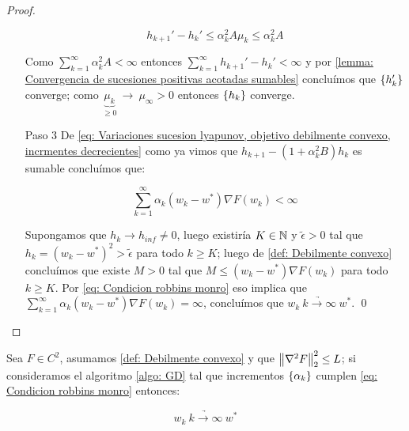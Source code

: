\begin{proof}
\begin{enumerate}
		\begin{equation*}
			h_{k+1}' - h_{k}' \leq \alpha_k^2 A \mu_k \leq \alpha_k^2 A
		\end{equation*}
		
		Como $\sum\limits_{k=1}^{\infty} {\alpha_k^2 A} < \infty$ entonces $\sum\limits_{k=1}^{\infty}{h_{k+1}' - h_{k}'} < \infty$ y por \ref{lemma: Convergencia de sucesiones positivas acotadas sumables} conclu\'imos que $\left\lbrace h_k'\right\rbrace$ converge; como $\underbrace{\mu_k}_{\geq 0} \ \rightarrow \ \mu_{\infty} > 0$ entonces $\left\lbrace h_k\right\rbrace$ converge.
		
		\item[Paso 3] De \ref{eq: Variaciones sucesion lyapunov, objetivo debilmente convexo, incrmentes decrecientes} como ya vimos que $	h_{k+1} - \left(1 + \alpha_k^2 B\right)h_k$ es sumable conclu\'imos que:
		
		\begin{equation*}
			\sum\limits_{k=1}^{\infty} {\alpha_k \left(w_k - w^* \right)\nabla F(w_k)} < \infty
		\end{equation*}
		
		Supongamos que $h_k \rightarrow h_{inf} \neq 0$, luego existir\'ia $K\in {\mathbb{N}}$ y $\widetilde{\epsilon} >0$ tal que $h_k = \left(w_k - w^*\right)^2 > \widetilde{\epsilon}$ para todo $k \geq K$; luego de \ref{def: Debilmente convexo} conclu\'imos que existe $M > 0$ tal que $M \leq \left(w_k - w^* \right)\nabla F(w_k) $ para todo $k \geq K$. Por \ref{eq: Condicion robbins monro} eso implica que $\sum\limits_{k=1}^{\infty} {\alpha_k \left(w_k - w^* \right)\nabla F(w_k)} = \infty$, conclu\'imos que $w_k \ \underrightarrow{k \rightarrow \infty} \ w^*$. \qed
		
	\end{enumerate}
	
\end{proof}

\begin{corollary}
	Sea $F \in C^2$, asumamos \ref{def: Debilmente convexo} y que $\left\lVert\nabla^2 F\right\rVert_2^2 \leq L$; si consideramos el algoritmo \ref{algo: GD} tal que incrementos $\left\lbrace\alpha_k\right\rbrace$  cumplen \ref{eq: Condicion robbins monro} entonces:
	
	\begin{equation}
	w_k \ \underrightarrow{k \rightarrow \infty} \ w^*
	\end{equation}
\end{corollary}